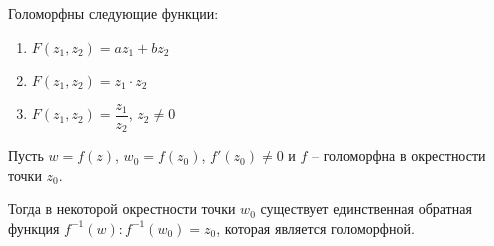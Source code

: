 \begin{corollary}
    Голоморфны следующие функции:

    \begin{enumerate}
        \item $F(z_1, z_2) = az_1 + bz_2$
        \item $F(z_1, z_2) = z_1 \cdot z_2$
        \item $F(z_1, z_2) = \dfrac{z_1}{z_2}$, $z_2 \neq 0$
    \end{enumerate}
\end{corollary}

\begin{theorem*}
    Пусть $w = f(z)$, $w_0 = f(z_0)$, $f'(z_0) \neq 0$ и $f$ -- голоморфна в окрестности точки $z_0$.

    Тогда в некоторой окрестности точки $w_0$ существует единственная обратная функция $f^{-1}(w): f^{-1}(w_0) = z_0$, которая является голоморфной.
\end{theorem*}

